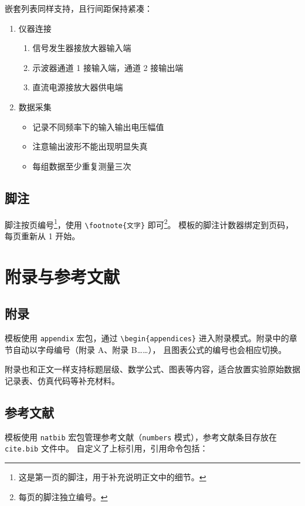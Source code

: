 \documentclass{sysu_report}
\begin{document}
嵌套列表同样支持，且行间距保持紧凑：

\begin{enumerate}
    \item 仪器连接
    \begin{enumerate}
        \item 信号发生器接放大器输入端
        \item 示波器通道 1 接输入端，通道 2 接输出端
        \item 直流电源接放大器供电端
    \end{enumerate}
    \item 数据采集
    \begin{itemize}
        \item 记录不同频率下的输入输出电压幅值
        \item 注意输出波形不能出现明显失真
        \item 每组数据至少重复测量三次
    \end{itemize}
\end{enumerate}

\subsection{脚注}
脚注按页编号\footnote{这是第一页的脚注，用于补充说明正文中的细节。}，使用 \verb|\footnote{文字}| 即可\footnote{每页的脚注独立编号。}。
模板的脚注计数器绑定到页码，每页重新从 1 开始。

\section{附录与参考文献}
\subsection{附录}
模板使用 \texttt{appendix} 宏包，通过 \verb|\begin{appendices}| 进入附录模式。附录中的章节自动以字母编号（附录 A、附录 B……），
且图表公式的编号也会相应切换。\par
附录也和正文一样支持标题层级、数学公式、图表等内容，适合放置实验原始数据记录表、仿真代码等补充材料。
\subsection{参考文献}
模板使用 \texttt{natbib} 宏包管理参考文献（\texttt{numbers} 模式），参考文献条目存放在 \texttt{cite.bib} 文件中。
自定义了上标引用，引用命令包括：
\end{document}
